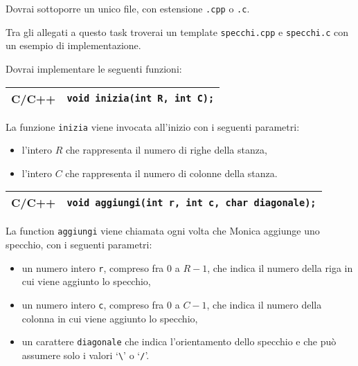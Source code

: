 
\Implementation

Dovrai sottoporre un unico file, con estensione \texttt{.cpp} o \texttt{.c}.

\begin{warning}
Tra gli allegati a questo task troverai un template \texttt{specchi.cpp} e \texttt{specchi.c} con un esempio di implementazione.
\end{warning}

Dovrai implementare le seguenti funzioni:

\begin{center}\begin{tabularx}{\textwidth}{|c|X|}
\hline
C/C++  & \verb|void inizia(int R, int C);|\\
\hline
\end{tabularx}\end{center}

La funzione \texttt{inizia} viene invocata all'inizio con i seguenti parametri:
\begin{itemize}[nolistsep]
  \item l'intero $R$ che rappresenta il numero di righe della stanza,
  \item l'intero $C$ che rappresenta il numero di colonne della stanza.
\end{itemize}

\medskip

\begin{center}\begin{tabularx}{\textwidth}{|c|X|}
\hline
C/C++  & \verb|void aggiungi(int r, int c, char diagonale);|\\
\hline
\end{tabularx}\end{center}

La function \texttt{aggiungi} viene chiamata ogni volta che Monica aggiunge uno specchio,
con i seguenti parametri:
\begin{itemize}[nolistsep]
  \item un numero intero \texttt{r}, compreso fra $0$ a $R-1$, che indica il numero della riga in cui viene aggiunto lo specchio,
  \item un numero intero \texttt{c}, compreso fra $0$ a $C-1$, che indica il numero della colonna in cui viene aggiunto lo specchio,
  \item un carattere \texttt{diagonale} che indica l'orientamento dello specchio e che può assumere solo i valori `\texttt{\textbackslash}' o `\texttt{/}'.
\end{itemize}

